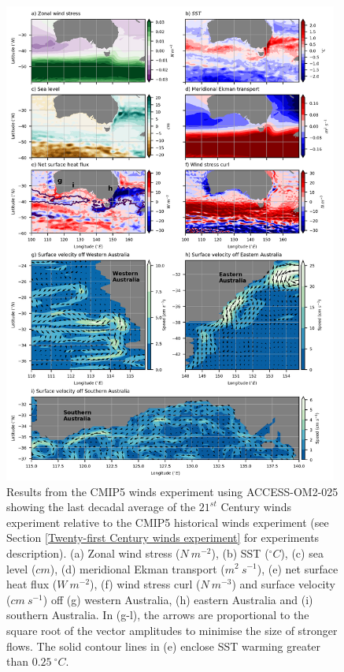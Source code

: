 \documentclass[draft,linenumbers]{agujournal2018}
\begin{document}
\begin{figure}[h]
\centering
\includegraphics[trim={0 0.25cm 0cm 0.1cm},clip, width=0.98\textwidth]{t09_fig1_.png}
\caption{Results from the CMIP5 winds experiment using ACCESS-OM2-025 showing the last decadal average of the $21^{st}$ Century winds experiment relative to the CMIP5 historical winds experiment (see Section \ref{Twenty-first Century winds experiment} for experiments description). (a) Zonal wind stress ($N\ m^{-2}$), (b) SST ($^{\circ}C$), (c) sea level ($cm$), (d) meridional Ekman transport ($m^2\ s^{-1}$), (e) net surface heat flux ($W\ m^{-2}$), (f) wind stress curl ($N\ m^{-3}$) and surface velocity ($cm\ s^{-1}$) off (g) western Australia, (h) eastern Australia and (i) southern Australia. In (g-l), the arrows are proportional to the square root of the vector amplitudes to minimise the size of stronger flows. The solid contour lines in (e) enclose SST warming greater than $0.25\ ^{\circ}C$.}\label{t09_fig1_}
\end{figure}
\end{document}
